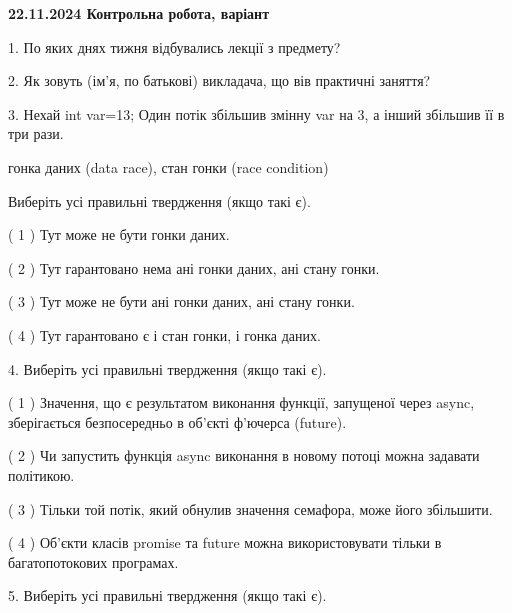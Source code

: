 \documentclass[12pt, ukrainian]{article}
\begin{document}
\vspace{4mm}
\newpage
\begin {large}

\textbf{22.11.2024 Контрольна робота, варіант  }\par


{
1. По яких днях тижня відбувались лекції з предмету?



\vspace{5mm}
2. Як зовуть (ім'я, по батькові) викладача, що вів практичні заняття?



\vspace{5mm}
3. Нехай int var=13; Один потік збільшив змінну var на 3, а інший збільшив її в три рази.

гонка даних (data race), стан гонки (race condition)

Виберіть усі правильні твердження (якщо такі є).\par
\vspace{2mm}
( 1 ) Тут може не бути гонки даних.%

( 2 ) Тут гарантовано нема ані гонки даних, ані стану гонки.%

( 3 ) Тут може не бути ані гонки даних, ані стану гонки.%

( 4 ) Тут гарантовано є і стан гонки, і гонка даних.%


\vspace{5mm}
4. Виберіть усі правильні твердження (якщо такі є).\par
\vspace{2mm}

( 1 ) Значення, що є результатом виконання функції, запущеної через async, зберігається безпосередньо в об’єкті ф’ючерса (future).%

( 2 ) Чи запустить функція  async виконання в новому потоці можна задавати політикою.%

( 3 ) Тільки той потік, який обнулив значення семафора, може його збільшити.%

( 4 ) Об’єкти класів promise та future можна використовувати тільки в багатопотокових програмах.%


\vspace{5mm}
5. Виберіть усі правильні твердження (якщо такі є).\par
\vspace{2mm}

}
\end{large}
\end{document}
